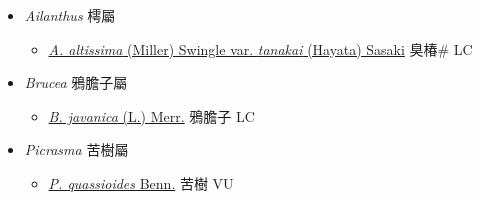 
  \begin{itemize}
 \item[] \textit{Ailanthus} 樗屬
                    
  \begin{itemize}
        \item[] \href{http://www.theplantlist.org/tpl1.1/search?q=Ailanthus+altissima+var.+tanakai}{\textit{A. altissima} (Miller) Swingle var. \textit{tanakai} (Hayata) Sasaki}   臭椿\# LC
  \end{itemize}
 \item[] \textit{Brucea} 鴉膽子屬
                    
  \begin{itemize}
        \item[] \href{http://www.theplantlist.org/tpl1.1/search?q=Brucea+javanica}{\textit{B. javanica} (L.) Merr.}   鴉膽子 LC
  \end{itemize}
 \item[] \textit{Picrasma} 苦樹屬
                    
  \begin{itemize}
        \item[] \href{http://www.theplantlist.org/tpl1.1/search?q=Picrasma+quassioides}{\textit{P. quassioides} Benn.}   苦樹 VU
  \end{itemize}
  \end{itemize}
